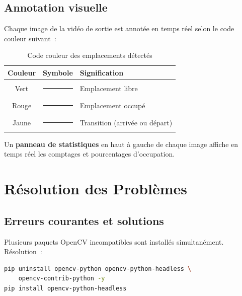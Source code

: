 \documentclass[12pt,a4paper]{report}
\begin{document}
\section{Annotation visuelle}

Chaque image de la vidéo de sortie est annotée en temps réel selon le code couleur suivant~:

\begin{table}[h!]
  \centering
  \caption{Code couleur des emplacements détectés}
  \begin{tabular}{ccl}
    \toprule
    \textbf{Couleur} & \textbf{Symbole} & \textbf{Signification} \\
    \midrule
    \cellcolor{mygreen!30}Vert   & \textcolor{mygreen}{\rule{1em}{1em}} & Emplacement libre \\
    \cellcolor{myred!30}Rouge    & \textcolor{myred}{\rule{1em}{1em}}   & Emplacement occupé \\
    \cellcolor{myyellow!40}Jaune & \textcolor{myyellow}{\rule{1em}{1em}} & Transition (arrivée ou départ) \\
    \bottomrule
  \end{tabular}
\end{table}

Un \textbf{panneau de statistiques} en haut à gauche de chaque image affiche en temps réel les comptages et pourcentages d'occupation.

\chapter{Résolution des Problèmes}

\section{Erreurs courantes et solutions}

\begin{tcolorbox}[colback=myred!5, colframe=myred!60, title={\texttt{AttributeError: module 'cv2' has no attribute 'VideoCapture'}}, fonttitle=\small\bfseries, breakable]
Plusieurs paquets OpenCV incompatibles sont installés simultanément. Résolution~:
\begin{lstlisting}[language=bash, numbers=none]
pip uninstall opencv-python opencv-python-headless \
    opencv-contrib-python -y
pip install opencv-python-headless
\end{lstlisting}
\end{tcolorbox}
\end{document}
